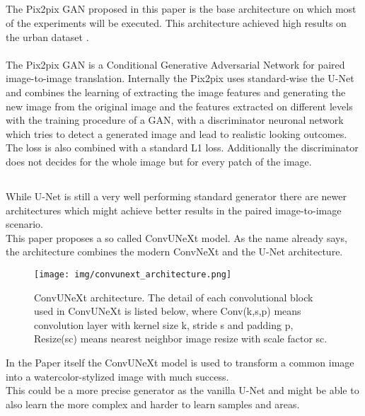 		\subsection{}
			The Pix2pix GAN proposed in this paper is the base architecture on which most of the experiments will be executed. This architecture achieved high results on the urban dataset \cite{spitznagel_urban_2024-1}.\\
			\\
			The Pix2pix GAN is a Conditional Generative Adversarial Network for paired image-to-image translation. Internally the Pix2pix uses standard-wise the U-Net \cite{ronneberger_u-net_2015} and combines the learning of extracting the image features and generating the new image from the original image and the features extracted on different levels with the training procedure of a GAN, with a discriminator neuronal network which tries to detect a generated image and lead to realistic looking outcomes. The loss is also combined with a standard L1 loss. Additionally the discriminator does not decides for the whole image but for every patch of the image.
			
		\subsection{}
			While U-Net \cite{ronneberger_u-net_2015} is still a very well performing standard generator there are newer architectures which might achieve better results in the paired image-to-image scenario.\\
			This paper proposes a so called ConvUNeXt model. As the name already says, the architecture combines the modern ConvNeXt and the U-Net architecture.
			\begin{figure}[H]
				\centering
				\texttt{[image: img/convunext\_architecture.png]}
				\caption[ConvUNeXt Architecture]{ConvUNeXt architecture. The detail of each convolutional block used in ConvUNeXt is listed below, where Conv(k,s,p) means convolution layer with kernel size k, stride s and padding p, Resize(sc) means nearest neighbor image resize with scale factor sc.}
				\label{fig:convunext}
			\end{figure}
			\FloatBarrier
			In the Paper itself the ConvUNeXt model is used to transform a common image into a watercolor-stylized image with much success.\\
			This could be a more precise generator as the vanilla U-Net and might be able to also learn the more complex and harder to learn samples and areas.
			
